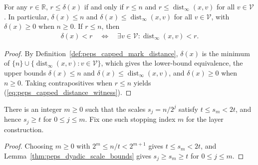 \begin{lemma}
    \label{thm:peps_capped_distance_bounds}
    \leanok
    For any $r\in\mathbb R$, $r\le\delta(x)$ if and only if $r\le n$ and
    $r\le\operatorname{dist}_{\infty}(x,v)$ for all $v\in\mathcal V$. In
    particular, $\delta(x)\le n$ and $\delta(x)\le\operatorname{dist}_{\infty}(x,v)$
    for all $v\in\mathcal V$, with $\delta(x)\ge0$ when $n\ge0$. If $r\le n$, then
    \begin{align}
        \delta(x)<r
        \quad\Longleftrightarrow\quad
        \exists v\in\mathcal V:\operatorname{dist}_{\infty}(x,v)<r.
        \label{eq:peps_capped_distance_witness}
    \end{align}
\end{lemma}
\begin{proof}
    \leanok
    By Definition~\ref{def:peps_capped_mark_distance}, $\delta(x)$ is the minimum
    of $\{n\}\cup\{\operatorname{dist}_{\infty}(x,v):v\in\mathcal V\}$, which
    gives the lower-bound equivalence, the upper bounds $\delta(x)\le n$ and
    $\delta(x)\le\operatorname{dist}_{\infty}(x,v)$, and $\delta(x)\ge0$ when
    $n\ge0$. Taking contrapositives when $r\le n$ yields
    (\ref{eq:peps_capped_distance_witness}).
\end{proof}

\begin{lemma}
    \label{thm:peps_annular_cutoff}
    \leanok
    There is an integer $m\ge0$ such that the scales $s_j=n/2^j$ satisfy
    $t\le s_m<2t$, and hence $s_j\ge t$ for $0\le j\le m$.
    Fix one such stopping index $m$ for the layer construction.
\end{lemma}
\begin{proof}
    \leanok
    Choosing $m\ge0$ with $2^m\le n/t<2^{m+1}$ gives $t\le s_m<2t$, and
    Lemma~\ref{thm:peps_dyadic_scale_bounds} gives $s_j\ge s_m\ge t$ for
    $0\le j\le m$.
\end{proof}

